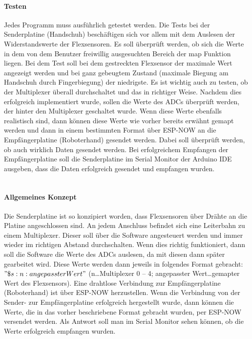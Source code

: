 \documentclass[titlepage,12pt,twoside]{article}
\begin{document}
\paragraph{Testen}
\hfill \break
\hfill \break
Jedes Programm muss ausführlich getestet werden. Die Tests bei der Senderplatine (Handschuh) beschäftigen sich vor allem mit 
dem Auslesen der Widerstandswerte der Flexsensoren. Es soll überprüft werden, ob sich die Werte in dem von dem Benutzer 
freiwillig ausgesuchten Bereich der map Funktion liegen. Bei dem Test soll bei dem gestreckten Flexsensor der maximale Wert 
angezeigt werden und bei ganz gebeugtem Zustand (maximale Biegung am Handschuh durch Fingerbiegung) der niedrigste. Es ist 
wichtig auch zu testen, ob der Multiplexer überall durchschaltet und das in richtiger Weise. Nachdem dies erfolgreich 
implementiert wurde, sollen die Werte des ADCs überprüft werden, der hinter den Multiplexer geschaltet wurde. Wenn diese Werte 
ebenfalls realistisch sind, dann können diese Werte wie vorher bereits erwähnt gemapt werden und dann in einem bestimmten Format 
über ESP-NOW an die Empfängerplatine (Roboterhand) gesendet werden. Dabei soll überprüft werden, ob auch wirklich Daten 
gesendet werden. Bei erfolgreichem Empfangen der Empfängerplatine soll die Senderplatine im Serial Monitor der Arduino IDE 
ausgeben, dass die Daten erfolgreich gesendet und empfangen wurden. \\
\\
\paragraph{Allgemeines Konzept}
\hfill \break
\hfill \break
Die Senderplatine ist so konzipiert worden, dass Flexsensoren über Drähte an die Platine angeschlossen sind. An jedem Anschluss 
befindet sich eine Leiterbahn zu einem Multiplexer. Dieser soll über die Software angesteuert werden und immer wieder im 
richtigen Abstand durchschalten. Wenn dies richtig funktioniert, dann soll die Software die Werte des ADCs auslesen, da mit 
diesen dann später gearbeitet wird. Diese Werte werden dann jeweils in folgendes Format gebracht: $"\$s:n:angepassterWert"$ 
(n…Multiplexer 0 – 4; angepasster Wert…gemapter Wert des Flexsensors). Eine drahtlose Verbindung zur Empfängerplatine 
(Roboterhand) ist über ESP-NOW herzustellen. Wenn die Verbindung von der Sender- zur Empfängerplatine erfolgreich hergestellt 
wurde, dann können die Werte, die in das vorher beschriebene Format gebracht wurden, per ESP-NOW versendet werden. Als Antwort 
soll man im Serial Monitor sehen können, ob die Werte erfolgreich empfangen wurden. \\
\\
\end{document}

